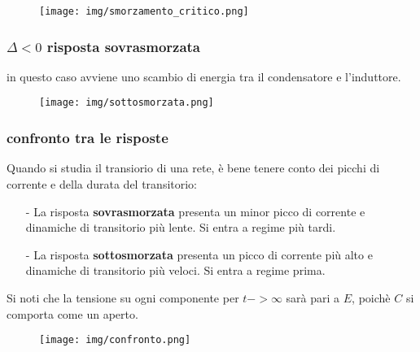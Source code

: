 \documentclass{article}
\begin{document}
\begin{figure}[h!]
    \begin{center}
        \texttt{[image: img/smorzamento\_critico.png]}
    \end{center}
\end{figure}

\subsubsection{$\Delta<0$ risposta sovrasmorzata}
\medskip

\noindent{}

\noindent in questo caso avviene uno scambio di energia tra il condensatore e l'induttore.

\begin{figure}[h!]
    \begin{center}
        \texttt{[image: img/sottosmorzata.png]}
    \end{center}
\end{figure}

\subsubsection{confronto tra le risposte}
\noindent Quando si studia il transiorio di una rete, è bene tenere conto dei picchi di corrente e della durata del transitorio:
\begin{itemize}
    \item[-] La risposta \textbf{sovrasmorzata} presenta un minor picco di corrente e dinamiche di transitorio più lente. Si entra a regime più tardi.
    \item[-] La risposta \textbf{sottosmorzata} presenta un picco di corrente più alto e dinamiche di transitorio più veloci. Si entra a regime prima.
\end{itemize}

\noindent Si noti che la tensione su ogni componente per $t->\infty$ sarà pari a $E$, poichè $C$ si comporta come un aperto.

\begin{figure}[h!]
    \begin{center}
        \texttt{[image: img/confronto.png]}
    \end{center}
\end{figure}
\end{document}
